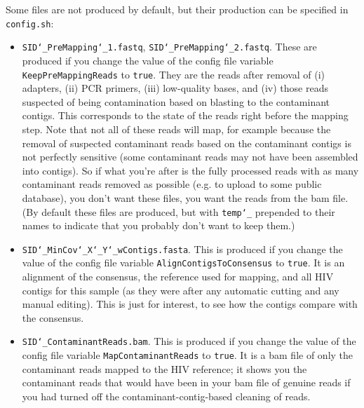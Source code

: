 \documentclass{article}
\let\c\texttt
\begin{document}
Some files are not produced by default, but their production can be specified in \c{config.sh}:
\begin{itemize}
\item \c{SID\char`_PreMapping\char`_1.fastq}, \c{SID\char`_PreMapping\char`_2.fastq}.
These are produced if you change the value of the config file variable \c{KeepPreMappingReads} to \c{true}.
They are the reads after removal of (i) adapters, (ii) PCR primers, (iii) low-quality bases, and (iv) those reads suspected of being contamination based on blasting to the contaminant contigs.
This corresponds to the state of the reads right before the mapping step.
Note that not all of these reads will map, for example because the removal of suspected contaminant reads based on the contaminant contigs is not perfectly sensitive (some contaminant reads may not have been assembled into contigs).
So if what you're after is the fully processed reads with as many contaminant reads removed as possible (e.g. to upload to some public database), you don't want these files, you want the reads from the bam file.
(By default these files are produced, but with \c{temp\char`_} prepended to their names to indicate that you probably don't want to keep them.)
\item \c{SID\char`_MinCov\char`_X\char`_Y\char`_wContigs.fasta}.
This is produced if you change the value of the config file variable \c{AlignContigsToConsensus} to \c{true}.
It is an alignment of the consensus, the reference used for mapping, and all HIV contigs for this sample (as they were after any automatic cutting and any manual editing).
This is just for interest, to see how the contigs compare with the consensus.
\item \c{SID\char`_ContaminantReads.bam}.
This is produced if you change the value of the config file variable \c{MapContaminantReads} to \c{true}.
It is a bam file of only the contaminant reads mapped to the HIV reference; it shows you the contaminant reads that would have been in your bam file of genuine reads if you had turned off the contaminant-contig-based cleaning of reads.
\end{itemize}
\end{document}

